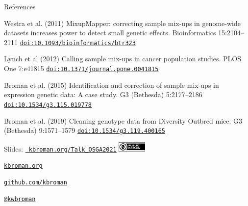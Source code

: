 \documentclass[12pt,t,aspectratio=169]{beamer}
\begin{document}
\begin{frame}[c]{References}

  \bbi

  \item Westra et al. (2011) MixupMapper: correcting sample mix-ups in
    genome-wide datasets increases power to detect small genetic
    effects. Bioinformatics 15:2104--2111
    \href{https://doi.org/10.1093/bioinformatics/btr323}{\tt doi:10.1093/bioinformatics/btr323}

  \item Lynch et al (2012) Calling sample mix-ups in cancer population
    studies. PLOS One 7:e41815
    \href{https://doi.org/10.1371/journal.pone.0041815}{\tt doi:10.1371/journal.pone.0041815}

  \item Broman et al. (2015) Identification and correction of sample
    mix-ups in expression genetic data: A case study. G3 (Bethesda)
    5:2177--2186
    \href{https://doi.org/10.1534/g3.115.019778}{\tt doi:10.1534/g3.115.019778}

  \item Broman et al. (2019) Cleaning genotype data from Diversity
    Outbred mice. G3 (Bethesda) 9:1571--1579
    \href{https://doi.org/10.1534/g3.119.400165}{\tt doi:10.1534/g3.119.400165}

  \ei


\end{frame}


\begin{frame}[c]{}

\Large

Slides: \href{https://kbroman.org/Talk_OSGA2021}{\tt
  kbroman.org/Talk\_OSGA2021} \quad
\includegraphics[height=5mm]{Figs/cc-zero.png}

\vspace{7mm}

\href{https://kbroman.org}{\tt \lolit kbroman.org}

\vspace{7mm}

\href{https://github.com/kbroman}{\tt \lolit github.com/kbroman}

\vspace{7mm}

\href{https://twitter.com/kwbroman}{\tt \lolit @kwbroman}


\end{frame}
\end{document}
